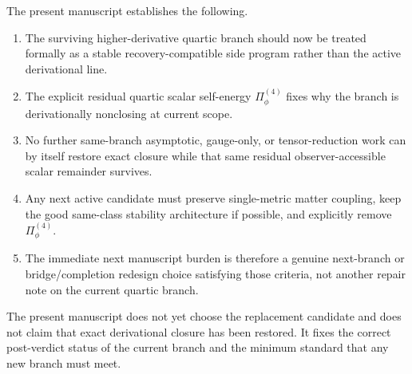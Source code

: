 \documentclass[11pt]{article}
\begin{document}
The present manuscript establishes the following.
\begin{enumerate}
    \item The surviving higher-derivative quartic branch should now be treated formally as a stable recovery-compatible side program rather than the active derivational line.
    \item The explicit residual quartic scalar self-energy \(\Pi_\phi^{(4)}\) fixes why the branch is derivationally nonclosing at current scope.
    \item No further same-branch asymptotic, gauge-only, or tensor-reduction work can by itself restore exact closure while that same residual observer-accessible scalar remainder survives.
    \item Any next active candidate must preserve single-metric matter coupling, keep the good same-class stability architecture if possible, and explicitly remove \(\Pi_\phi^{(4)}\).
    \item The immediate next manuscript burden is therefore a genuine next-branch or bridge/completion redesign choice satisfying those criteria, not another repair note on the current quartic branch.
\end{enumerate}

The present manuscript does not yet choose the replacement candidate and does not claim that exact derivational closure has been restored. It fixes the correct post-verdict status of the current branch and the minimum standard that any new branch must meet.
\end{document}
